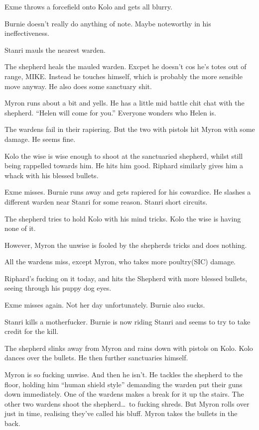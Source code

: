 Exme throws a forcefield onto Kolo and gets all blurry.\medskip

Burnie doesn't really do anything of note. Maybe noteworthy in his ineffectiveness.\medskip

Stanri mauls the nearest warden.\medskip

The shepherd heals the mauled warden. Excpet he doesn't cos he's totes out of range, MIKE. Instead he touches himself, which is probably the more sensible move anyway. He also does some sanctuary shit.\medskip

Myron runs about a bit and yells. He has a little mid battle chit chat with the shepherd. ``Helen will come for you.'' Everyone wonders who Helen is.\medskip

The wardens fail in their rapiering. But the two with pistols hit Myron with some damage. He seems fine.\medskip

Kolo the wise is wise enough to shoot at the sanctuaried shepherd, whilst still being rappelled towards him. He hits him good. Riphard similarly gives him a whack with his blessed bullets.\medskip

Exme misses. Burnie runs away and gets rapiered for his cowardice. He slashes a different warden near Stanri for some reason. Stanri short circuits.\medskip

The shepherd tries to hold Kolo with his mind tricks. Kolo the wise is having none of it.\medskip

However, Myron the unwise is fooled by the shepherds tricks and does nothing.\medskip

All the wardens miss, except Myron, who takes more poultry(SIC) damage.\medskip

Riphard's fucking on it today, and hits the Shepherd with more blessed bullets, seeing through his puppy dog eyes.\medskip

Exme misses again. Not her day unfortunately. Burnie also sucks.\medskip

Stanri kills a motherfucker. Burnie is now riding Stanri and seems to try to take credit for the kill.\medskip

The shepherd slinks away from Myron and rains down with pistols on Kolo. Kolo dances over the bullets. He then further sanctuaries himself.\medskip

Myron is so fucking unwise. And then he isn't. He tackles the shepherd to the floor, holding him ``human shield style'' demanding the warden put their guns down immediately. One of the wardens makes a break for it up the stairs. The other two wardens shoot the shepherd\ldots\ to fucking shreds. But Myron rolls over just in time, realising they've called his bluff. Myron takes the bullets in the back.\medskip


